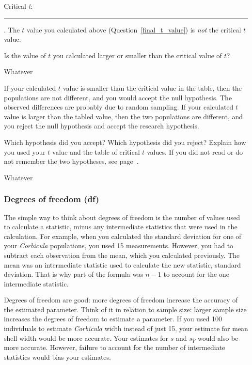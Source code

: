 \documentclass[12pt]{exam}
\newcommand*\AnswerBox[2]{%
    \parbox[t][#1]{0.92\textwidth}{%
    \begin{solution}#2\end{solution}}
}
\newcommand*\meansubY{\overline{Y}}
\newcommand*\Corbicula{\textit{Corbicula}}
\newcommand*\AnswerBlank{\rule{0.75in}{0.4pt}\kern0.67pt.}
\begin{document}
\begin{questions}
Critical \textit{t}: \AnswerBlank{}  The $t$ value you calculated above (Question~\ref{final_t_value}) is \emph{not} the critical $t$ value.

\bigskip

\question
Is the value of $t$ you calculated larger or smaller than the critical value of $t$?

\AnswerBox{3\baselineskip}{Whatever}

If your calculated $t$ value is smaller than the critical value in the table, then the populations are not different, and you would accept the null hypothesis. The observed differences are probably due to random sampling. If your calculated $t$ value is larger than the tabled value, then the two populations are different, and you reject the null hypothesis and accept the research hypothesis.


\question[Checkout]
Which hypothesis did you accept? Which hypothesis did you reject? Explain how you used your $t$ value and the table of critical $t$ values. If you did not read or do not remember the two hypotheses, see page~\pageref{two_hypotheses}.

\AnswerBox{3\baselineskip}{Whatever}




\end{questions}

\newpage

\subsubsection*{Degrees of freedom (df)}\label{degrees_freedom}

The simple way to think about degrees of freedom is the number of values used to calculate a statistic, minus any intermediate statistics that were used in the calculation. For example, when you calculated the standard deviation for one of your \Corbicula{} populations, you used 15 measurements. However, you had to subtract each observation from the mean, which you calculated previously. The mean was an intermediate statistic used to calculate the new statistic, standard deviation. That is why part of the formula was $n-1$ to account for the one intermediate statistic. 

Degrees of freedom are good: more degrees of freedom increase the accuracy of the estimated parameter. Think of it in relation to sample size: larger sample size increases the degrees of freedom to estimate a parameter. If you used 100 individuals to estimate \Corbicula{} width instead of just 15, your estimate for mean shell width would be more accurate. Your estimates for $s$ and $s_{\meansubY}$ would also be more accurate. However, failure to account for the number of intermediate statistics would bias your estimates.
\end{document}
